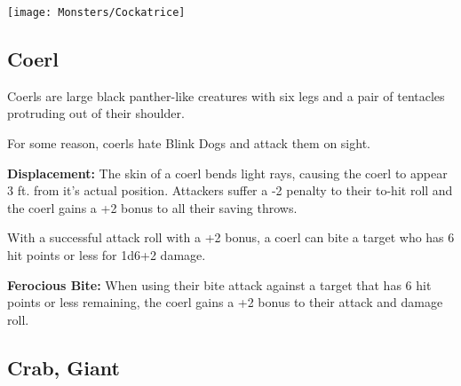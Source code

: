 \begin{multicols*}{2}
\texttt{[image: Monsters/Cockatrice]}

\subsection{Coerl}

Coerls are large black panther-like creatures with six legs and a pair of tentacles protruding out of their shoulder.

For some reason, coerls hate Blink Dogs and attack them on sight.

\textbf{Displacement:} The skin of a coerl bends light rays, causing the coerl to appear 3 ft. from it's actual position. Attackers suffer a -2 penalty to their to-hit roll and the coerl gains a +2 bonus to all their saving throws.

With a successful attack roll with a +2 bonus, a coerl can bite a target who has 6 hit points or less for 1d6+2 damage.

\textbf{Ferocious Bite:} When using their bite attack against a target that has 6 hit points or less remaining, the coerl gains a +2 bonus to their attack and damage roll.

\subsection{Crab, Giant}
\end{multicols*}
